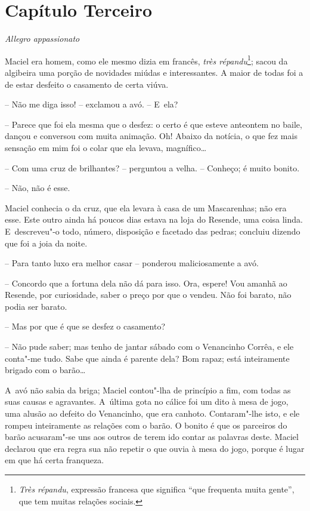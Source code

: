 \section{Capítulo Terceiro}

\emph{Allegro appassionato}

Maciel era homem, como ele mesmo dizia em francês, \emph{très
répandu}\footnote{\emph{Très répandu}, expressão francesa que significa
  ``que frequenta muita gente'', que tem muitas relações sociais.};
sacou da algibeira uma porção de novidades miúdas e interessantes. A
maior de todas foi a de estar desfeito o casamento de certa viúva.

-- Não me diga isso! -- exclamou a avó. -- E~ela?

-- Parece que foi ela mesma que o desfez: o certo é que esteve anteontem
no baile, dançou e conversou com muita animação. Oh! Abaixo da notícia,
o que fez mais sensação em mim foi o colar que ela levava, magnífico\ldots{}

-- Com uma cruz de brilhantes? -- perguntou a velha. -- Conheço; é muito
bonito.

-- Não, não é esse.

Maciel conhecia o da cruz, que ela levara à casa de um Mascarenhas; não
era esse. Este outro ainda há poucos dias estava na loja do Resende, uma
coisa linda. E~descreveu"-o todo, número, disposição e facetado das
pedras; concluiu dizendo que foi a joia da noite.

-- Para tanto luxo era melhor casar -- ponderou maliciosamente a avó.

-- Concordo que a fortuna dela não dá para isso. Ora, espere! Vou amanhã
ao Resende, por curiosidade, saber o preço por que o vendeu. Não foi
barato, não podia ser barato.

-- Mas por que é que se desfez o casamento?

-- Não pude saber; mas tenho de jantar sábado com o Venancinho Corrêa, e
ele conta"-me tudo. Sabe que ainda é parente dela? Bom rapaz; está
inteiramente brigado com o barão\ldots{}

A~avó não sabia da briga; Maciel contou"-lha de princípio a fim, com
todas as suas causas e agravantes. A~última gota no cálice foi um dito à
mesa de jogo, uma alusão ao defeito do Venancinho, que era canhoto.
Contaram"-lhe isto, e ele rompeu inteiramente as relações com o barão. O
bonito é que os parceiros do barão acusaram"-se uns aos outros de terem
ido contar as palavras deste. Maciel declarou que era regra sua não
repetir o que ouvia à mesa do jogo, porque é lugar em que há certa
franqueza.

